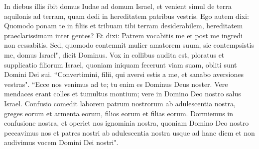 \begin{biblechapter}
\verse In diebus illis ibit domus Iudae ad domum Israel, et venient simul de terra aquilonis ad terram, quam dedi in hereditatem patribus vestris. 
\verse Ego autem dixi: Quomodo ponam te in filiis et tribuam tibi terram desiderabilem, hereditatem praeclarissimam inter gentes? Et dixi: Patrem vocabitis me et post me ingredi non cessabitis. 
\verse Sed, quomodo contemnit mulier amatorem suum, sic contempsistis me, domus Israel", dicit Dominus. 
\verse Vox in collibus audita est, ploratus et supplicatio filiorum Israel, quoniam iniquam fecerunt viam suam, obliti sunt Domini Dei sui. 
\verse “Convertimini, filii, qui aversi estis a me, et sanabo aversiones vestras". “Ecce nos venimus ad te; tu enim es Dominus Deus noster. 
\verse Vere mendaces erant colles et tumultus montium; vere in Domino Deo nostro salus Israel. 
\verse Confusio comedit laborem patrum nostrorum ab adulescentia nostra, greges eorum et armenta eorum, filios eorum et filias eorum. 
\verse Dormiemus in confusione nostra, et operiet nos ignominia nostra, quoniam Domino Deo nostro peccavimus nos et patres nostri ab adulescentia nostra usque ad hanc diem et non audivimus vocem Domini Dei nostri". 
\end{biblechapter}


